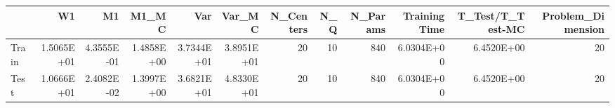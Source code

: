 \begin{tabular}{lrrrrrrrrrrr}
\toprule
{} &         W1 &         M1 &      M1\_MC &        Var &     Var\_MC &  N\_Centers &  N\_Q &  N\_Params &  Training Time &  T\_Test/T\_Test-MC &  Problem\_Dimension \\
\midrule
Train & 1.5065E+01 & 4.3555E-01 & 1.4858E+00 & 3.7344E+01 & 3.8951E+01 &         20 &   10 &       840 &     6.0304E+00 &        6.4520E+00 &                 20 \\
Test  & 1.0666E+01 & 2.4082E-02 & 1.3997E+00 & 3.6821E+01 & 4.8330E+01 &         20 &   10 &       840 &     6.0304E+00 &        6.4520E+00 &                 20 \\
\bottomrule
\end{tabular}
